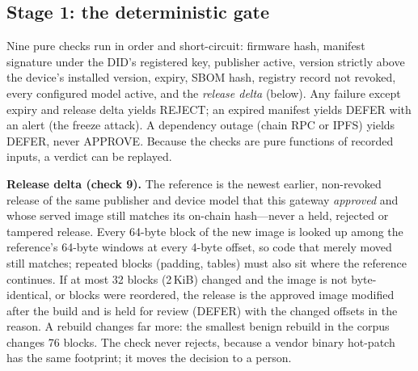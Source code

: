 \documentclass[conference]{IEEEtran}
\begin{document}
\subsection{Stage 1: the deterministic gate}
Nine pure checks run in order and short-circuit: firmware hash, manifest signature under the
DID's registered key, publisher active, version strictly above the device's installed version,
expiry, SBOM hash, registry record not revoked, every configured model active, and the
\emph{release delta} (below). Any failure except expiry and release delta yields REJECT; an
expired manifest yields DEFER with an alert (the freeze attack). A dependency outage (chain RPC or
IPFS) yields DEFER, never APPROVE. Because the checks are pure functions of recorded inputs, a
verdict can be replayed.

\textbf{Release delta (check 9).} The reference is the newest earlier, non-revoked release of the
same publisher and device model that this gateway \emph{approved} and whose served image still
matches its on-chain hash---never a held, rejected or tampered release. Every 64-byte block of
the new image is looked up among the reference's 64-byte windows at every 4-byte offset, so code
that merely moved still matches; repeated blocks (padding, tables) must also sit where the
reference continues. If at most 32 blocks (2\,KiB) changed and the image is not byte-identical,
or blocks were reordered, the release is the approved image modified after the build and is held
for review (DEFER) with the changed offsets in the reason. A rebuild changes far more: the
smallest benign rebuild in the corpus changes 76 blocks. The check never rejects, because a vendor
binary hot-patch has the same footprint; it moves the decision to a person.
\end{document}
